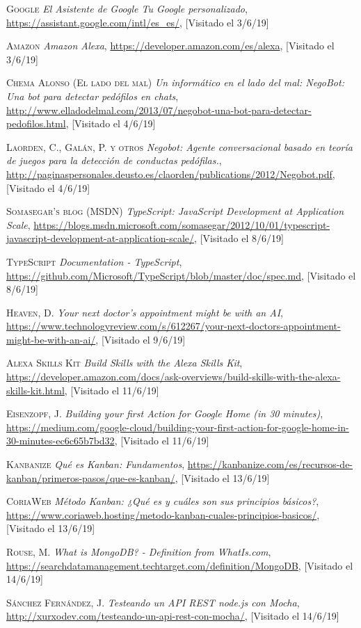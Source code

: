 \documentclass[spanish,12pt, a4paper, twoside]{paper}
\begin{document}
\begin{thebibliography}{00}
 \textsc{Google} \textit{El Asistente de Google \textbar Tu Google personalizado}, \url{https://assistant.google.com/intl/es_es/}, [Visitado el 3/6/19]

 \textsc{Amazon} \textit{Amazon Alexa}, \url{https://developer.amazon.com/es/alexa}, [Visitado el 3/6/19]

 \textsc{Chema Alonso (El lado del mal)} \textit{Un informático en el lado del mal: NegoBot: Una bot para detectar pedófilos en chats}, \url{http://www.elladodelmal.com/2013/07/negobot-una-bot-para-detectar-pedofilos.html}, [Visitado el 4/6/19]

 \textsc{Laorden, C., Galán, P. y otros} \textit{Negobot: Agente conversacional basado en teoría de juegos para la detección de conductas pedófilas.}, \url{http://paginaspersonales.deusto.es/claorden/publications/2012/Negobot.pdf}, [Visitado el 4/6/19]

 \textsc{Somasegar's blog (MSDN)} \textit{TypeScript: JavaScript Development at Application Scale}, \url{https://blogs.msdn.microsoft.com/somasegar/2012/10/01/typescript-javascript-development-at-application-scale/}, [Visitado el 8/6/19]

 \textsc{TypeScript} \textit{Documentation - TypeScript}, \url{https://github.com/Microsoft/TypeScript/blob/master/doc/spec.md}, [Visitado el 8/6/19]

 \textsc{Heaven, D.} \textit{Your next doctor's appointment might be with an AI}, \url{https://www.technologyreview.com/s/612267/your-next-doctors-appointment-might-be-with-an-ai/}, [Visitado el 9/6/19]

 \textsc{Alexa Skills Kit} \textit{Build Skills with the Alexa Skills Kit}, \url{https://developer.amazon.com/docs/ask-overviews/build-skills-with-the-alexa-skills-kit.html}, [Visitado el 11/6/19]

 \textsc{Eisenzopf, J.} \textit{Building your first Action for Google Home (in 30 minutes)}, \url{https://medium.com/google-cloud/building-your-first-action-for-google-home-in-30-minutes-ec6c65b7bd32}, [Visitado el 11/6/19]

 \textsc{Kanbanize} \textit{Qué es Kanban: Fundamentos}, \url{https://kanbanize.com/es/recursos-de-kanban/primeros-pasos/que-es-kanban/}, [Visitado el 13/6/19]

 \textsc{CoriaWeb} \textit{Método Kanban: ¿Qué es y cuáles son sus principios básicos?}, \url{https://www.coriaweb.hosting/metodo-kanban-cuales-principios-basicos/}, [Visitado el 13/6/19]

 \textsc{Rouse, M.} \textit{What is MongoDB? - Definition from WhatIs.com}, \url{https://searchdatamanagement.techtarget.com/definition/MongoDB}, [Visitado el 14/6/19]

 \textsc{Sánchez Fernández, J.} \textit{Testeando un API REST node.js con Mocha}, \url{http://xurxodev.com/testeando-un-api-rest-con-mocha/}, [Visitado el 14/6/19]
\end{thebibliography}
\end{document}
